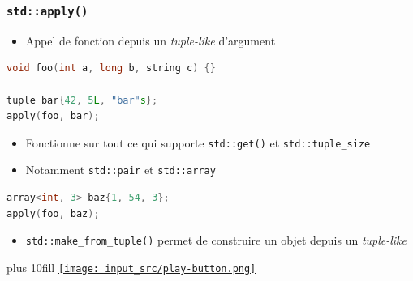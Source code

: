 \documentclass[C++.tex]{subfiles}
\begin{document}
\begin{frame}[fragile]
	\frametitle{\lstinline|std::apply()|}
	\begin{itemize}
		\item Appel de fonction depuis un \textit{tuple-like} d'argument
	\end{itemize}

	\begin{lstlisting}[language=C++]
void foo(int a, long b, string c) {}

tuple bar{42, 5L, "bar"s};
apply(foo, bar);\end{lstlisting}

	\begin{itemize}
		\item Fonctionne sur tout ce qui supporte \lstinline|std::get()| et \lstinline|std::tuple_size|
		\item Notamment \lstinline|std::pair| et \lstinline|std::array|
	\end{itemize}

	\begin{lstlisting}[language=C++]
array<int, 3> baz{1, 54, 3};
apply(foo, baz);\end{lstlisting}

	\begin{itemize}
		\item \lstinline|std::make_from_tuple()| permet de construire un objet depuis un \textit{tuple-like}
	\end{itemize}

	\vskip 10mm plus 10fill
	\hfill
	\href{https://godbolt.org/#g:!((g:!((g:!((h:codeEditor,i:(filename:'1',fontScale:14,fontUsePx:'0',j:1,lang:c%2B%2B,selection:(endColumn:1,endLineNumber:30,positionColumn:1,positionLineNumber:30,selectionStartColumn:1,selectionStartLineNumber:30,startColumn:1,startLineNumber:30),source:'%23include+%3Ciostream%3E%0A%23include+%3Ctuple%3E%0A%23include+%3Cstring%3E%0A%0Ausing+namespace+std::literals%3B%0A%0Astatic+void+foo(int+a,+long+b,+std::string+c)%0A%7B%0A++std::cout+%3C%3C+a+%3C%3C+!'+!'+%3C%3C+b+%3C%3C+!'+!'+%3C%3C+c+%3C%3C+!'%5Cn!'%3B%0A%7D%0A%0Astatic+void+bar(int+a,+int+b,+int+c)%0A%7B%0A++std::cout+%3C%3C+a+%3C%3C+!'+!'+%3C%3C+b+%3C%3C+!'+!'+%3C%3C+c+%3C%3C+!'%5Cn!'%3B%0A%7D%0A%0Aint+main()%0A%7B%0A++%7B%0A++++std::tuple+baz%7B42,+5L,+%22bar%22s%7D%3B%0A++++std::apply(foo,+baz)%3B%0A++%7D%0A%0A++%7B%0A++++std::array%3Cint,+3%3E+baz%7B42,+5,+12%7D%3B%0A++++std::apply(bar,+baz)%3B%0A++%7D%0A%0A%7D%0A'),l:'5',n:'0',o:'C%2B%2B+source+%231',t:'0')),k:50,l:'4',n:'0',o:'',s:0,t:'0'),(g:!((h:executor,i:(argsPanelShown:'1',compilationPanelShown:'0',compiler:g112,compilerOutShown:'0',execArgs:'',execStdin:'',fontScale:14,fontUsePx:'0',j:1,lang:c%2B%2B,libs:!((name:boost,ver:'175')),options:'-std%3Dc%2B%2B17+-Wall+-Wextra',source:1,stdinPanelShown:'1',tree:'1',wrap:'0'),l:'5',n:'0',o:'Executor+x86-64+gcc+11.2+(C%2B%2B,+Editor+%231)',t:'0')),header:(),k:50,l:'4',n:'0',o:'',s:0,t:'0')),l:'2',n:'0',o:'',t:'0')),version:4}{\texttt{[image: input\_src/play-button.png]}}
\end{frame}
\end{document}
